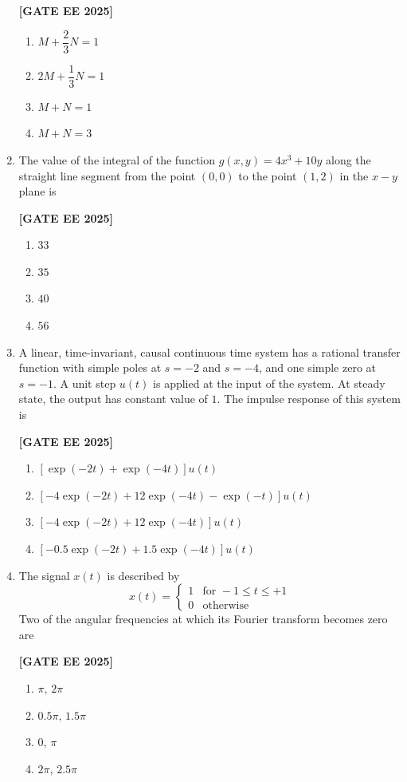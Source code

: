 \documentclass[12pt]{article}
\begin{document}
\begin{enumerate}[leftmargin=*, label=\textbf{Q.\arabic*:}]
\noindent \textbf{[GATE EE 2025]}
\begin{enumerate}[label=(\Alph*)]
    \item $M + \dfrac{2}{3} N = 1$
    \item $2M + \dfrac{1}{3}N = 1$
    \item $M + N = 1$
    \item $M + N = 3$
\end{enumerate}

\item The value of the integral of the function $g(x, y) = 4x^3 + 10y$ along the straight line segment from the point $(0,0)$ to the point $(1,2)$ in the $x-y$ plane is
 
\noindent \textbf{[GATE EE 2025]}
\begin{enumerate}[label=(\Alph*)]
    \item $33$
    \item $35$
    \item $40$
    \item $56$
\end{enumerate}

\item A linear, time-invariant, causal continuous time system has a rational transfer function with simple poles at $s=-2$ and $s= -4$, and one simple zero at $s=-1$. A unit step $u(t)$ is applied at the input of the system. At steady state, the output has constant value of $1$. The impulse response of this system is
 
\noindent \textbf{[GATE EE 2025]}
\begin{enumerate}[label=(\Alph*)]
    \item $\left[\exp(-2t)+\exp(-4t) \right]u(t)$
    \item $\left[ -4\exp(-2t) + 12\exp(-4t) -\exp(-t) \right]u(t)$
    \item $\left[ -4\exp(-2t) + 12\exp(-4t) \right]u(t)$
    \item $\left[ -0.5\exp(-2t) + 1.5\exp(-4t) \right]u(t)$
\end{enumerate}

\item The signal $x(t)$ is described by
\[
x(t) = \begin{cases}
1 & \text{for } -1 \leq t \leq +1 \\
0 & \text{otherwise}
\end{cases}
\]
Two of the angular frequencies at which its Fourier transform becomes zero are
 
\noindent \textbf{[GATE EE 2025]}
\begin{enumerate}[label=(\Alph*)]
    \item $\pi,\,2\pi$
    \item $0.5\pi,\,1.5\pi$
    \item $0,\,\pi$
    \item $2\pi,\,2.5\pi$
\end{enumerate}


\end{enumerate}
\end{document}
